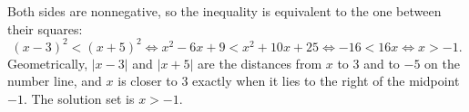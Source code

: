 Both sides are nonnegative, so the inequality is equivalent to the one between their squares:
\[
(x-3)^2<(x+5)^2\iff x^2-6x+9<x^2+10x+25\iff -16<16x\iff x>-1 .
\]
Geometrically, $|x-3|$ and $|x+5|$ are the distances from $x$ to $3$ and to $-5$ on the number line, and $x$ is closer to $3$ exactly when it lies to the right of the midpoint $-1$. The solution set is $\boxed{x>-1}$.
